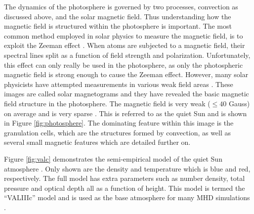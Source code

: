     The dynamics of the photosphere is governed by two processes, convection as discussed above, and the solar magnetic field.
    Thus understanding how the magnetic field is structured within the photosphere is important. 
    The most common method employed in solar physics to measure the magnetic field, is to exploit the Zeeman effect \citep{phillips1995guide}.
    When atoms are subjected to a magnetic field, their spectral lines split as a function of field strength and polarization.
    Unfortunately, this effect can only really be used in the photosphere, as only the photospheric magnetic field is strong enough to cause the Zeeman effect.
    However, many solar physicists have attempted measurements in various weak field areas \citep{1995ApJ...439..474M,1538-4357-613-2-L177,2008A&A...489L..57K}.
    These images are called solar magnetograms and they have revealed the basic magnetic field structure in the photosphere.
    The magnetic field is very weak ($\le 40$ Gauss) on average and is very sparse \citep{0004-637X-636-1-496,2011A&A...526A..60V}.
    This is referred to as the quiet Sun and is shown in Figure \ref{fig:photosphere}. 
    The dominating feature within this image is the granulation cells, which are the structures formed by convection, as well as several small magnetic features which are detailed further on. 
    
    Figure \ref{fig:valc} demonstrates the semi-empirical model of the quiet Sun atmosphere \citep{1981ApJS...45..635V}.
    Only shown are the density and temperature which is blue and red, respectively.
    The full model has extra parameters such as number density, total pressure and optical depth all as a function of height.
    This model is termed the ``VALIIIc'' model and is used as the base atmosphere for many MHD simulations \citep{Mumford2015,GFME13a,fedun1,fedun2,2011AnGeo..29..883S,Wedemeyer2012,Vigeesh2012,0004-637X-743-1-14}.
    

